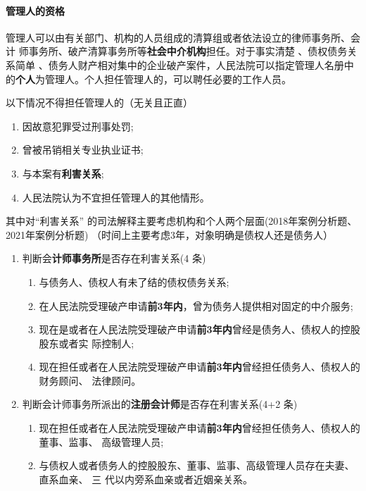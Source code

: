 \documentclass[UTF8,12pt]{ctexart}
\numberwithin{equation}{section} %
\numberwithin{figure}{section}
\numberwithin{table}{section}
\begin{document}
	\paragraph{管理人的资格}
	管理人可以由有关部门、机构的人员组成的清算组或者依法设立的律师事务所、会计 师事务所、破产清算事务所等\textbf{社会中介机构}担任。对于事实清楚 、债权债务关系简单 、债务人财产相对集中的企业破产案件，人民法院可以指定管理人名册中的\textbf{个人}为管理人。个人担任管理人的，可以聘任必要的工作人员。
	
	以下情况不得担任管理人的（无关且正直）
	\begin{enumerate}
		\item 因故意犯罪受过刑事处罚;
		
		\item 曾被吊销相关专业执业证书;
		
		\item 与本案有\textbf{利害关系};
		
		\item 人民法院认为不宜担任管理人的其他情形。
	\end{enumerate}

	其中对“利害关系” 的司法解释主要考虑机构和个人两个层面(2018年案例分析题、2021年案例分析题) （时间上主要考虑3年，对象明确是债权人还是债务人）
	\begin{enumerate}
		\item 判断会\textbf{计师事务所}是否存在利害关系(4 条)
		\begin{enumerate}
			\item 与债务人、债权人有未了结的债权债务关系;
			
			\item 在人民法院受理破产申请\textbf{前3年内}，曾为债务人提供相对固定的中介服务; 
			
			\item 现在是或者在人民法院受理破产申请\textbf{前3年内}曾经是债务人、债权人的控股股东或者实 际控制人;
			
			\item 现在担任或者在人民法院受理破产申请\textbf{前3年内}曾经担任债务人、债权人的财务顾问、 法律顾问。
		\end{enumerate}
		
		\item 判断会计师事务所派出的\textbf{注册会计师}是否存在利害关系(4+2 条) 
		\begin{enumerate}
			\item 现在担任或者在人民法院受理破产申请\textbf{前3年内}曾经担任债务人、债权人的董事、监事、 高级管理人员; 
			
			\item 与债权人或者债务人的控股股东、董事、监事、高级管理人员存在夫妻、直系血亲、 三 代以内旁系血亲或者近姻亲关系。
		\end{enumerate}
	\end{enumerate}
	
\end{document}
